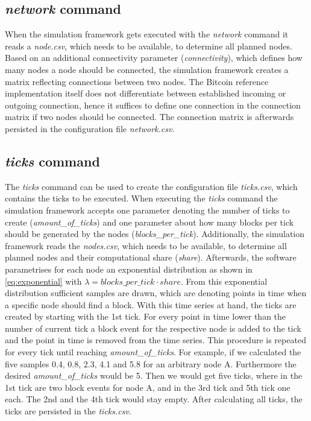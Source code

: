 \subsection{\textit{network} command} \label{chap:network_command}

When the simulation framework gets executed with the \textit{network} command it reads a \textit{node.csv}, which needs to be available, to determine all planned nodes.
Based on an additional connectivity parameter (\textit{connectivity}), which defines how many nodes a node should be connected, the simulation framework creates a matrix reflecting connections between two nodes.
The Bitcoin reference implementation itself does not differentiate between established incoming or outgoing connection, hence it suffices to define one connection in the connection matrix if two nodes should be connected.
The connection matrix is afterwards persisted in the configuration file \textit{network.csv}.

\subsection{\textit{ticks} command} \label{chap:ticks_command}

The \textit{ticks} command can be used to create the configuration file \textit{ticks.csv}, which contains the ticks to be executed.
When executing the \textit{ticks} command the simulation framework accepts one parameter denoting the number of ticks to create (\textit{amount\_of\_ticks}) and one parameter about how many blocks per tick should be generated by the nodes (\textit{blocks\_per\_tick}).
Additionally, the simulation framework reads the \textit{nodes.csv}, which needs to be available, to determine all planned nodes and their computational share (\textit{share}).
Afterwards, the software parametrises for each node an exponential distribution as shown in \ref{eq:exponential} with $\lambda = blocks\_per\_tick \cdot share$.
From this exponential distribution sufficient samples are drawn, which are denoting points in time when a specific node should find a block.
With this time series at hand, the ticks are created by starting with the 1st tick.
For every point in time lower than the number of current tick a block event for the respective node is added to the tick and the point in time is removed from the time series.
This procedure is repeated for every tick until reaching \textit{amount\_of\_ticks}.
For example, if we calculated the five samples 0.4, 0.8, 2.3, 4.1 and 5.8 for an arbitrary node A.
Furthermore the desired \textit{amount\_of\_ticks} would be 5.
Then we would get five ticks, where in the 1st tick are two block events for node A, and in the 3rd tick  and 5th tick one each.
The 2nd and the 4th tick would stay empty. After calculating all ticks, the ticks are persisted in the \textit{ticks.csv}.


